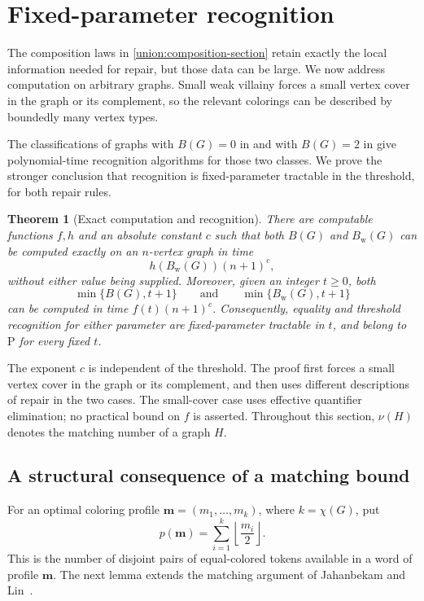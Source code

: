 \documentclass[10pt,a4paper]{amsart}
\numberwithin{equation}{section}
\newtheorem{theorem}{Theorem}[section]
\theoremstyle{definition}
\theoremstyle{remark}
\begin{document}

\section{Fixed-parameter recognition}\label{rec:section}

The composition laws in \cref{union:composition-section} retain exactly
the local information needed for repair, but those data can be large.
We now address computation on arbitrary graphs. Small weak villainy
forces a small vertex cover in the graph or its complement, so the
relevant colorings can be described by boundedly many vertex types.

The classifications of graphs with $B(G)=0$ in
\cite{clark2006} and with $B(G)=2$ in \cite{jahanbekam2021}
give polynomial-time recognition algorithms for those two classes.
We prove the stronger conclusion that recognition is fixed-parameter
tractable in the threshold, for both repair rules.


\begin{theorem}[Exact computation and recognition]\label{rec:main}
\label{rec:exact-parameter}
There are computable functions $f,h$ and an absolute constant $c$
such that both $B(G)$ and $B_{\mathrm w}(G)$ can be computed exactly
on an $n$-vertex graph in time
\[
 h(B_{\mathrm w}(G))(n+1)^c,
\]
without either value being supplied. Moreover, given an integer
$t\geq0$, both
\[
\min\{B(G),t+1\}\qquad\text{and}\qquad
\min\{B_{\mathrm w}(G),t+1\}
\]
can be computed in time $f(t)(n+1)^c$.
Consequently, equality and threshold recognition for either parameter
are fixed-parameter tractable in $t$, and belong to $\mathrm P$
for every fixed $t$.
\end{theorem}


The exponent $c$ is independent of the threshold. The proof first forces
a small vertex cover in the graph or its complement, and then uses
different descriptions of repair in the two cases. The small-cover
case uses effective quantifier elimination; no practical bound on
$f$ is asserted. Throughout this section,
$\nu(H)$ denotes the matching number of a graph $H$.

\subsection{A structural consequence of a matching bound}

For an optimal coloring profile $\mathbf m=(m_1,\ldots,m_k)$, where
$k=\chi(G)$, put
\[
p(\mathbf m)=\sum_{i=1}^k\left\lfloor\frac{m_i}{2}\right\rfloor.
\]
This is the number of disjoint pairs of equal-colored tokens available
in a word of profile $\mathbf m$. The next lemma extends the matching
argument of Jahanbekam and Lin~\cite[Lemma~8]{jahanbekam2021}.
\end{document}
